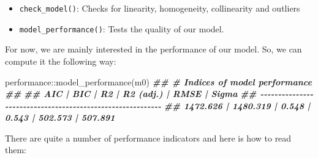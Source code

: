 \documentclass[
]{book}
\newenvironment{Shaded}{\begin{snugshade}}{\end{snugshade}}
\newcommand{\DocumentationTok}[1]{\textcolor[rgb]{0.56,0.35,0.01}{\textbf{\textit{#1}}}}
\newcommand{\FunctionTok}[1]{\textcolor[rgb]{0.00,0.00,0.00}{#1}}
\newcommand{\NormalTok}[1]{#1}
\newcommand{\SpecialCharTok}[1]{\textcolor[rgb]{0.00,0.00,0.00}{#1}}
\begin{document}
\begin{itemize}
\item
  \texttt{check\_model()}: Checks for linearity, homogeneity, collinearity and outliers
\item
  \texttt{model\_performance()}: Tests the quality of our model.
\end{itemize}

For now, we are mainly interested in the performance of our model. So, we can compute it the following way:

\begin{Shaded}
\begin{Highlighting}[]
\NormalTok{performance}\SpecialCharTok{::}\FunctionTok{model\_performance}\NormalTok{(m0)}
\DocumentationTok{\#\# \# Indices of model performance}
\DocumentationTok{\#\# }
\DocumentationTok{\#\# AIC      |      BIC |    R2 | R2 (adj.) |    RMSE |   Sigma}
\DocumentationTok{\#\# {-}{-}{-}{-}{-}{-}{-}{-}{-}{-}{-}{-}{-}{-}{-}{-}{-}{-}{-}{-}{-}{-}{-}{-}{-}{-}{-}{-}{-}{-}{-}{-}{-}{-}{-}{-}{-}{-}{-}{-}{-}{-}{-}{-}{-}{-}{-}{-}{-}{-}{-}{-}{-}{-}{-}{-}{-}{-}{-}}
\DocumentationTok{\#\# 1472.626 | 1480.319 | 0.548 |     0.543 | 502.573 | 507.891}
\end{Highlighting}
\end{Shaded}

There are quite a number of performance indicators and here is how to read them:
\end{document}
